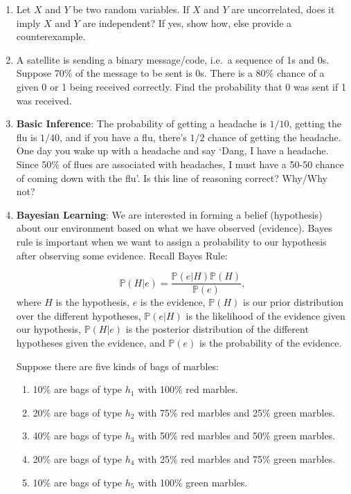 \documentclass[11pt,onecolumn]{article}
\begin{document}
\begin{enumerate}
    \item Let $X$ and $Y$ be two random variables. If $X$ and $Y$ are uncorrelated, does it imply $X$ and $Y$ are independent? If yes, show how, else provide a counterexample. 
    
    \item A satellite is sending a binary message/code, i.e.\ a sequence of 1s and 0s. Suppose 70\% of the message to be sent is 0s. There is a 80\% chance of a given 0 or 1 being received correctly. Find the probability that 0 was sent if 1 was received. 
    
    \item \textbf{Basic Inference}: The probability of getting a headache is $1/10$, getting the flu is $1/40$, and if you have a flu, there's $1/2$ chance of getting the headache. One day you wake up with a headache and say `Dang, I have a headache. Since 50\% of flues are associated with headaches, I must have a 50-50 chance of coming down with the flu'. Is this line of reasoning correct? Why/Why not? 

    \item \textbf{Bayesian Learning}: We are interested in forming a belief (hypothesis) about our environment based on what we have observed (evidence). Bayes rule is important when we want to assign a probability to our hypothesis after observing some evidence. Recall Bayes Rule:
    
    \begin{equation*}
        \mathbb{P}(H|e) = \frac{\mathbb{P}(e|H) \mathbb{P}(H)}{\mathbb{P}(e)},
    \end{equation*}
    where $H$ is the hypothesis, $e$ is the evidence, $\mathbb{P}(H)$ is our prior distribution over the different hypotheses, $\mathbb{P}(e|H)$ is the likelihood of the evidence given our hypothesis, $\mathbb{P}(H|e)$ is the posterior distribution of the different hypotheses given the evidence, and $\mathbb{P}(e)$ is the probability of the evidence.
    
    Suppose there are five kinds of bags of marbles: 
    \begin{enumerate}
        \item 10\% are bags of type $h_1$ with 100\% red marbles.
        \item 20\% are bags of type $h_2$ with 75\% red marbles and 25\% green marbles.
        \item 40\% are bags of type $h_3$ with 50\% red marbles and 50\% green marbles.
        \item 20\% are bags of type $h_4$ with 25\% red marbles and 75\% green marbles.
        \item 10\% are bags of type $h_5$ with 100\% green marbles.
    \end{enumerate}
    

\end{enumerate}
\end{document}
